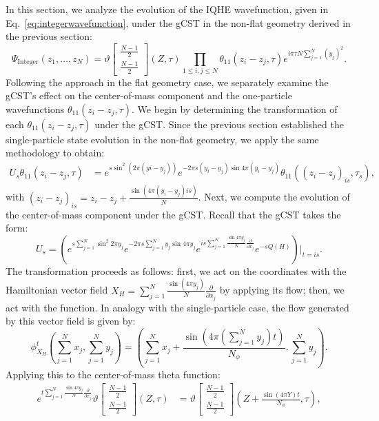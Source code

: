 \documentclass[a4paper,11pt]{article}
\begin{document}
In this section, we analyze the evolution of the IQHE wavefunction, given in Eq.~\eqref{eq:integerwavefunction}, under the gCST in the non-flat geometry derived in the previous section:
\begin{equation*}
\Psi_{\mathrm{Integer}}(z_{1},\dots,z_{N}) = \vartheta\begin{bmatrix}
\frac{N-1}{2}\\
\frac{N-1}{2}
\end{bmatrix}(Z,\tau)\prod_{1\leq i,j\leq N}\theta_{11}(z_{i}-z_{j},\tau)e^{i\pi \tau N\sum_{j=1}^{N}(y_{j})^2}.
\end{equation*}
Following the approach in the flat geometry case, we separately examine the gCST's effect on the center-of-mass component and the one-particle wavefunctions $\theta_{11}(z_{i}-z_{j},\tau)$. We begin by determining the transformation of each $\theta_{11}(z_{i}-z_{j},\tau)$ under the gCST. Since the previous section established the single-particle state evolution in the non-flat geometry, we apply the same methodology to obtain:
\begin{align*}
U_{s}\theta_{11}(z_{i}-z_{j},\tau) &= e^{s\sin^2{(2\pi(y{i}-y_{j}))}}e^{-2\pi s(y_{i}-y_{j})\sin{4\pi(y_{i}-y_{j})}}\theta_{11}((z_{i}-z_{j})_{is},\tau_s),
\end{align*}
with $(z_{i}-z_{j})_{is}=z_{i}-z_{j}+\frac{\sin{(4\pi(y_{i}-y_{j})is)}}{N}$.
Next, we compute the evolution of the center-of-mass component under the gCST. Recall that the gCST takes the form:
\begin{equation*}
U_{s} = \left(e^{s\sum_{j=1}^{N}\sin^2{2\pi y_{j}}}e^{-2\pi s \sum_{j=1}^{N}y_{j}\sin{4\pi y_{j}}}e^{is\sum_{j=1}^{N}\frac{\sin{4\pi y_{j}}}{N}\frac{\partial}{\partial x_{j}}}e^{-sQ(H)}\right)\bigg|_{t=is}.
\end{equation*}
The transformation proceeds as follows: first, we act on the coordinates with the Hamiltonian vector field $X_H = \sum_{j=1}^{N} \frac{\sin(4\pi y_j)}{N} \frac{\partial}{\partial x_j}$ by applying its flow; then, we act with the function. In analogy with the single-particle case, the flow generated by this vector field is given by:
\begin{equation*}
\phi^{t}_{X_{H}}(\sum_{j=1}^{N}x_{j},\sum_{j=1}^{N}y_{j}) = \left(\sum_{j=1}^{N}x_{j} + \frac{\sin\left(4\pi \left(\sum_{j=1}^{N}y_{j}\right)t\right)}{N_{\phi}}, \sum_{j=1}^{N}y_{j}\right).
\end{equation*}
Applying this to the center-of-mass theta function:
\begin{align*}
e^{t\sum_{j=1}^{N}\frac{\sin{4\pi y_{j}}}{N}\frac{\partial}{\partial x_{j}}} \vartheta\begin{bmatrix}
\frac{N-1}{2}\\
\frac{N-1}{2}
\end{bmatrix}(Z,\tau) &= \vartheta\begin{bmatrix}
\frac{N-1}{2}\\
\frac{N-1}{2}
\end{bmatrix}\left(Z + \frac{\sin{(4\pi Y)}t}{N_{\phi}}, \tau\right),
\end{align*}
\end{document}

